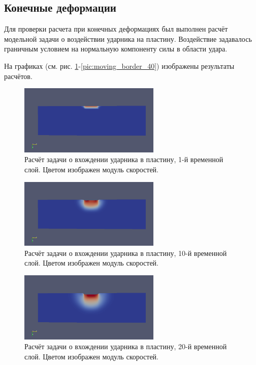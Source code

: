 \clearpage
\newpage

\subsection{Конечные деформации}
Для проверки расчета при конечных деформациях был выполнен расчёт модельной задачи о воздействии ударника на пластину. Воздействие задавалось граничным условием на нормальную компоненту силы в области удара.

На графиках (см. рис. \ref{pic:moving_border_1}-\ref{pic:moving_border_40}) изображены результаты расчётов.

\begin{figure}[htp]
\centering
\includegraphics[width=0.6\textwidth]{png/border-test/v-2d/0001.png}
\caption{Расчёт задачи о вхождении ударника в пластину, 1-й временной слой. Цветом изображен модуль скоростей.}
\label{pic:moving_border_1}
\end{figure}

\begin{figure}[htp]
\centering
\includegraphics[width=0.6\textwidth]{png/border-test/v-2d/0010.png}
\caption{Расчёт задачи о вхождении ударника в пластину, 10-й временной слой. Цветом изображен модуль скоростей.}
\end{figure}

\begin{figure}[htp]
\centering
\includegraphics[width=0.6\textwidth]{png/border-test/v-2d/0020.png}
\caption{Расчёт задачи о вхождении ударника в пластину, 20-й временной слой. Цветом изображен модуль скоростей.}
\end{figure}

